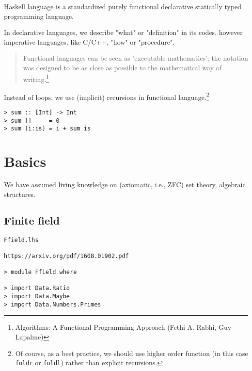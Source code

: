\documentclass[11pt]{book}
\begin{document}
Haskell language is a standardized purely functional declarative statically typed programming language.

In declarative languages, we describe "what" or "definition" in its codes, however imperative languages, like C/C++, "how" or "procedure".
\begin{quotation}
Functional languages can be seen as 'executable mathematics'; the notation was designed to be as close as possible to the mathematical way of writing.\footnote{
Algorithms: A Functional Programming Approach (Fethi A. Rabhi, Guy Lapalme)
}
\end{quotation}
Instead of loops, we use (implicit) recursions in functional language.\footnote{Of course, as a best practice, we should use higher order function (in this case \texttt{foldr} or \texttt{foldl}) rather than explicit recursions.
}
\begin{verbatim}
> sum :: [Int] -> Int
> sum []     = 0
> sum (i:is) = i + sum is
\end{verbatim}



\chapter{Basics}
We have assumed living knowledge on (axiomatic, i.e., ZFC) set theory, algebraic structures.

\section{Finite field}
\begin{verbatim}
Ffield.lhs

https://arxiv.org/pdf/1608.01902.pdf

> module Ffield where

> import Data.Ratio 
> import Data.Maybe
> import Data.Numbers.Primes
\end{verbatim}
\end{document}
